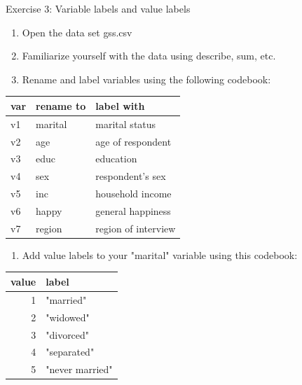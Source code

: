 \documentclass[table,smaller]{beamer}
\begin{document}
\begin{frame}[label=sec-4-3]{Exercise 3: Variable labels and value labels}
\begin{enumerate}
\item Open the data set \alert{gss.csv}
\item Familiarize yourself with the  data using describe, sum, etc.
\item Rename and label variables using the following codebook:
\end{enumerate}
{ \scriptsize
\begin{center}
\begin{tabular}{lll}
\alert{var} & \alert{rename to} & \alert{label with}\\
\hline
v1 & marital & marital status\\
v2 & age & age of respondent\\
v3 & educ & education\\
v4 & sex & respondent's sex\\
v5 & inc & household income\\
v6 & happy & general happiness\\
v7 & region & region of interview\\
\hline
\end{tabular}
\end{center}
}
\begin{enumerate}
\item Add value labels to your "marital" variable using this codebook:
\end{enumerate}
{ \scriptsize
\begin{center}
\begin{tabular}{rl}
\alert{value} & \alert{label}\\
\hline
1 & "married"\\
2 & "widowed"\\
3 & "divorced"\\
4 & "separated"\\
5 & "never married"\\
\hline
\end{tabular}
\end{center}
}
\end{frame}
\end{document}
